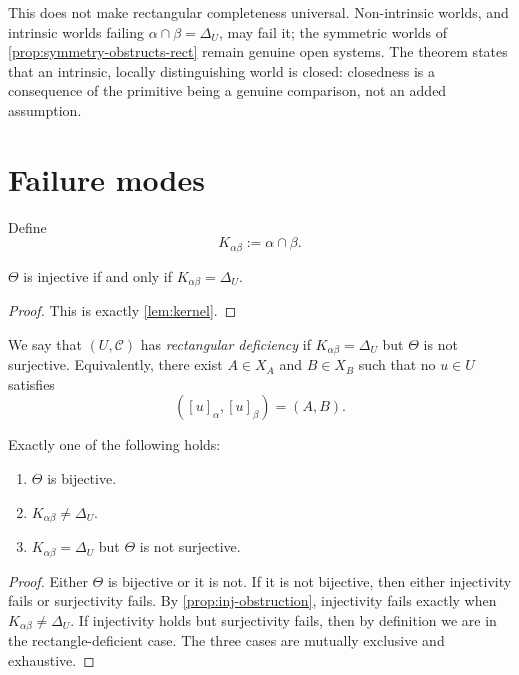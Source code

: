 \begin{remark}
	\label{rem:intrinsic-rect-not-universal}
	This does not make rectangular completeness universal. Non-intrinsic
	worlds, and intrinsic worlds failing \(\alpha\cap\beta=\Delta_U\), may
	fail it; the symmetric worlds of \cref{prop:symmetry-obstructs-rect}
	remain genuine open systems. The theorem states that an intrinsic,
	locally distinguishing world is closed: closedness is a consequence of
	the primitive being a genuine comparison, not an added assumption.
\end{remark}
\section{Failure modes}
\label{sec:failure}
\begin{definition}
	Define
	\[
		K_{\alpha\beta}:=\alpha\cap\beta.
	\]
\end{definition}
\begin{proposition}
	\label{prop:inj-obstruction}
	\(\Theta\) is injective if and only if \(K_{\alpha\beta}=\Delta_U\).
\end{proposition}
\begin{proof}
	This is exactly \cref{lem:kernel}.
\end{proof}
\begin{definition}
	We say that \((U,\mathcal C)\) has \emph{rectangular deficiency} if
	\(K_{\alpha\beta}=\Delta_U\) but \(\Theta\) is not surjective.
	Equivalently, there exist \(A\in X_A\) and \(B\in X_B\) such that no
	\(u\in U\) satisfies
	\[
		([u]_\alpha,[u]_\beta)=(A,B).
	\]
\end{definition}
\begin{theorem}
	Exactly one of the following holds:
	\begin{enumerate}
		\item[\emph{(D)}] \(\Theta\) is bijective.
		\item[\emph{(K)}] \(K_{\alpha\beta}\neq\Delta_U\).
		\item[\emph{(R)}] \(K_{\alpha\beta}=\Delta_U\) but \(\Theta\) is not surjective.
	\end{enumerate}
\end{theorem}
\begin{proof}
	Either \(\Theta\) is bijective or it is not. If it is not bijective,
	then either injectivity fails or surjectivity fails. By
	\cref{prop:inj-obstruction}, injectivity fails exactly when
	\(K_{\alpha\beta}\neq\Delta_U\). If injectivity holds but surjectivity fails, then
	by definition we are in the rectangle-deficient case.
	The three cases are mutually exclusive and exhaustive.
\end{proof}
